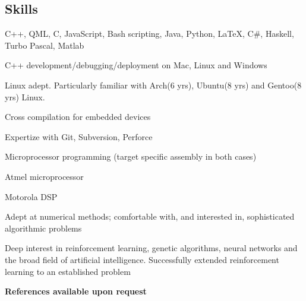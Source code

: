 \documentclass{article}
\begin{document}
\subsection*{Skills}
\begin{itemize*}
\item{C++, QML, C, JavaScript, Bash scripting, Java, Python, \LaTeX, C\#, Haskell, Turbo Pascal, Matlab}
\item{C++ development/debugging/deployment on Mac, Linux and Windows}
\item{Linux adept. Particularly familiar with Arch(6 yrs), Ubuntu(8 yrs) and Gentoo(8 yrs) Linux.}
\item{Cross compilation for embedded devices}
\item{Expertize with Git, Subversion, Perforce}
\item{Microprocessor programming (target specific assembly in both cases) }
\begin{itemize*}
\item{Atmel microprocessor}
\item{Motorola DSP}
\end{itemize*}
\item{Adept at numerical methods; comfortable with, and interested in, sophisticated algorithmic problems}
\item{Deep interest in reinforcement learning, genetic algorithms, neural networks and the broad field of artificial intelligence. Successfully extended reinforcement learning to an established problem}
\end{itemize*}

\bf{References available upon request}
 
\end{document}
